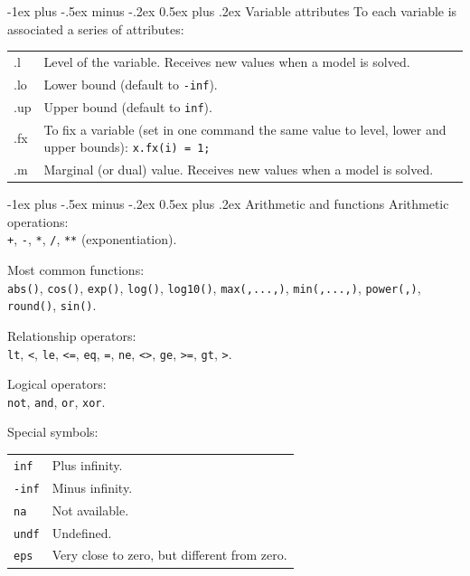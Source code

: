 \documentclass[10pt,landscape,a4paper]{article}
\makeatletter
\renewcommand{\section}{\@startsection{section}{1}{0mm}%
                                {-1ex plus -.5ex minus -.2ex}%
                                {0.5ex plus .2ex}%
                                {\color{blue}\normalfont\large\bfseries}}
\makeatother
\begin{document}
\begin{multicols}{2}
\section{Variable attributes}
To each variable is associated a series of attributes:\\
\begin{tabularx}{\columnwidth}{@{}>{\ttfamily}lX@{}}
  .l & Level of the variable. Receives new values when a model is solved.\\
  .lo & Lower bound (default to \texttt{-inf}).\\
  .up & Upper bound (default to \texttt{inf}).\\
  .fx & To fix a variable (set in one command the same value to level, lower
  and upper bounds):\linebreak{}
  \texttt{x.fx(i) = 1;}\\
  .m & Marginal (or dual) value. Receives new values when a model is solved.
\end{tabularx}

\section{Arithmetic and functions}
Arithmetic operations:\\
\verb!+!, \verb!-!, \verb!*!, \verb!/!, \verb!**! (exponentiation).

Most common functions:\\
\verb!abs()!, \verb!cos()!, \verb!exp()!, \verb!log()!, \verb!log10()!,
\verb!max(,...,)!, \verb!min(,...,)!, \verb!power(,)!, \verb!round()!,
\verb!sin()!.

Relationship operators:\\
\verb!lt!, \verb!<!, \verb!le!, \verb!<=!, \verb!eq!, \verb!=!, \verb!ne!, \verb!<>!, \verb!ge!, \verb!>=!, \verb!gt!, \verb!>!.

Logical operators:\\
\verb!not!, \verb!and!, \verb!or!, \verb!xor!.

Special symbols:\\
\begin{tabular}{@{}ll@{}}
  \verb!inf!& Plus infinity.\\
  \verb!-inf!& Minus infinity.\\
  \verb!na!& Not available.\\
  \verb!undf!& Undefined.\\
  \verb!eps!& Very close to zero, but different from zero.
\end{tabular}


\end{multicols}
\end{document}
